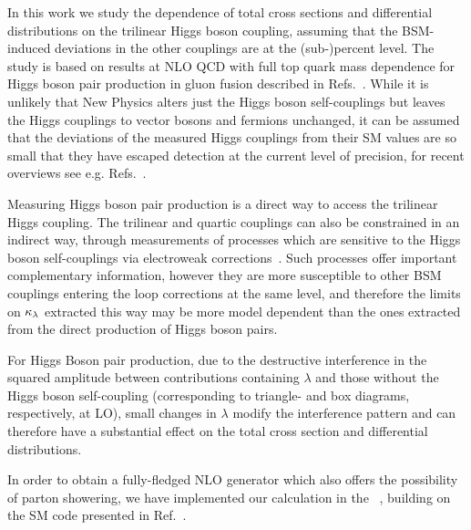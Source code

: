

In this work we study the dependence of total cross sections and differential distributions on the trilinear Higgs boson coupling, assuming that the BSM-induced deviations in the other couplings are at the (sub-)percent level.
The study is based on results at NLO QCD with full top quark mass dependence for Higgs boson pair production in gluon fusion described in Refs.~\cite{Borowka:2016ehy,Borowka:2016ypz}. 
While it is unlikely that New Physics alters just the Higgs boson self-couplings but leaves the Higgs couplings to vector bosons and fermions unchanged, it can be assumed that the deviations of the measured Higgs couplings from their SM values are so small that they have escaped detection at the current level of precision, for recent overviews see e.g. Refs.~\cite{Cepeda:2019klc,Brooijmans:2018xbu,deFlorian:2016spz}.

Measuring Higgs boson pair production is a direct way to access the trilinear Higgs coupling. The trilinear and quartic couplings can also be constrained in an indirect way, through measurements of processes which are sensitive to the Higgs boson self-couplings via electroweak corrections~\cite{Gorbahn:2019lwq,Nakamura:2018bli,Borowka:2018pxx,Bizon:2018syu,Kilian:2018bhs,Vryonidou:2018eyv,Maltoni:2018ttu,Maltoni:2017ims,Kribs:2017znd,Degrassi:2017ucl,Bizon:2016wgr,Degrassi:2016wml,Gorbahn:2016uoy,McCullough:2013rea}.
Such processes offer important complementary information, however they are more susceptible to other BSM couplings entering the loop corrections 
at the same level, and therefore the limits on $\kappa_{\lambda}$ extracted this way may be more model dependent than the ones extracted from the direct production of Higgs boson pairs.

For Higgs Boson pair production, due to the destructive interference in the squared amplitude between contributions containing $\lambda$ and those without the Higgs boson self-coupling (corresponding to triangle- and box diagrams, respectively, at LO), 
small changes in $\lambda$ modify the interference pattern and can therefore have a substantial effect on the total cross section and differential distributions.

In order to obtain a fully-fledged NLO generator which also offers the possibility of parton showering, we have implemented our calculation in the 
\powhegbox~\cite{Nason:2004rx,Frixione:2007vw,Alioli:2010xd}, building on the SM code presented in Ref.~\cite{Heinrich:2017kxx}.


